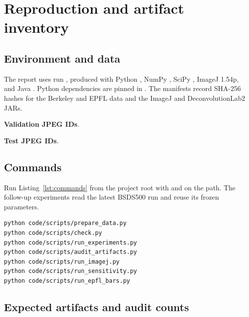 \section{Reproduction and artifact inventory}
\label{app:reproduce}

\subsection{Environment and data}

The report uses run \texttt{\RunID}, produced with Python \PythonVersion, NumPy \NumPyVersion, SciPy \SciPyVersion, ImageJ 1.54p, and Java \JVMVersion. Python dependencies are pinned in . The manifests record SHA-256 hashes for the Berkeley and EPFL data and the ImageJ and DeconvolutionLab2 JARs.

\textbf{Validation JPEG IDs}\quad\ValidationIDs.

\textbf{Test JPEG IDs}\quad\TestIDs.

\subsection{Commands}

Run Listing~\ref{lst:commands} from the project root with  and  on the path. The follow-up experiments read the latest BSDS500 run and reuse its frozen parameters.

\begin{lstlisting}[style=paper,language=bash,caption={Commands for the experiments and numerical checks.},
label={lst:commands}]
python code/scripts/prepare_data.py
python code/scripts/check.py
python code/scripts/run_experiments.py
python code/scripts/audit_artifacts.py
python code/scripts/run_imagej.py
python code/scripts/run_sensitivity.py
python code/scripts/run_epfl_bars.py
\end{lstlisting}

\clearpage
\subsection{Expected artifacts and audit counts}

